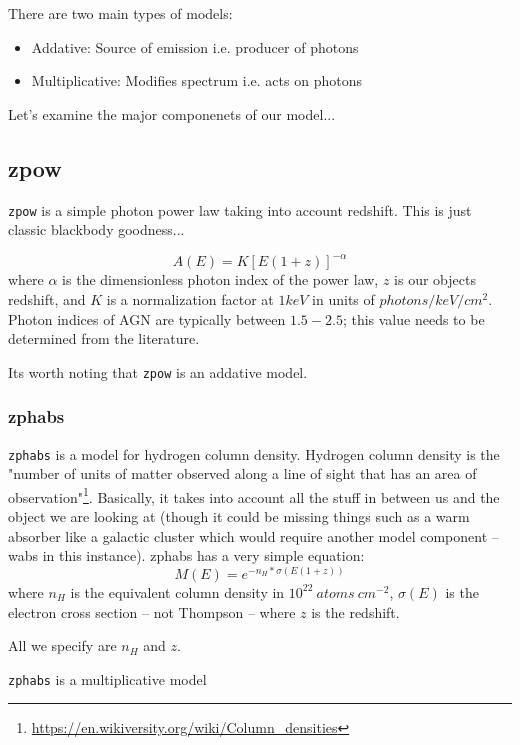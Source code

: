 \documentclass[11pt,letterpaper]{article}
\begin{document}
There are two main types of models:
\begin{itemize}
	\item Addative: Source of emission i.e. producer of photons
	\item Multiplicative: Modifies spectrum i.e. acts on photons
\end{itemize}

Let's examine the major componenets of our model...

\subsection{zpow}
\texttt{zpow} is a simple photon power law taking into account redshift. This is just classic blackbody goodness...

\begin{equation}
	A(E) = K[E(1+z)]^{-\alpha}
\end{equation}
where $\alpha$ is the dimensionless photon index of the power law, $z$ is our objects redshift, and $K$ is a normalization factor  at $1keV$ in units of $photons/keV/cm^2$. Photon indices of AGN are typically between $1.5 - 2.5$; this value needs to be determined from the literature.

Its worth noting that \texttt{zpow} is an addative model.

\subsubsection{zphabs}
\texttt{zphabs} is a model for hydrogen column density. Hydrogen column density is the "number of units of matter observed along a line of sight that has an area of observation"\footnote{\href{https://en.wikiversity.org/wiki/Column_densities}{https://en.wikiversity.org/wiki/Column\_densities}}. Basically, it takes into account all the stuff in between us and the object we are looking at (though it could be missing things such as a warm absorber like a galactic cluster which would require another model component -- wabs in this instance). zphabs has a very simple equation:
\begin{equation}
	M(E) = e^{-n_H*\sigma(E(1+z))}
\end{equation}
where $n_H$ is the equivalent column density in $10^{22} \ atoms \ cm^{-2}$, $\sigma(E)$ is the electron cross section -- not Thompson -- where $z$ is the redshift.

All we specify are $n_H$ and $z$.

\texttt{zphabs} is a multiplicative model
\end{document}
